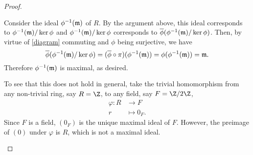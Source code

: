 \documentclass[10pt]{amsart}
\begin{document}
\begin{thm}
\begin{proof}
\begin{enumerate}[(a)]
      Consider the ideal $\phi^{-1}(\mathfrak{m})$ of $R$.  
      By the argument above, this ideal corresponds to $\phi^{-1}(\mathfrak{m}) / \ker \phi$ and $\phi^{-1}(\mathfrak{m}) / \ker \phi$ corresponds to $\overline{\phi}(\phi^{-1}(\mathfrak{m})/\ker \phi)$.
      Then, by virtue of \eqref{diagram} commuting and $\phi$ being surjective, we have 
      $$\overline{\phi}(\phi^{-1}(\mathfrak{m})/\ker \phi) = (\overline{\phi} \circ \pi)(\phi^{-1}(\mathfrak{m})) = \phi(\phi^{-1}(\mathfrak{m})) = \mathfrak{m}.$$
      Therefore $\phi^{-1}(\mathfrak{m})$ is maximal, as desired.

      To see that this does not hold in general, take the trivial homomorphism from any non-trivial ring, say $R = \Z$, to any field, say $F = \Z/2\Z$,
      \begin{align*}
        \varphi \colon R &\rightarrow F\\
        r &\mapsto 0_F.
      \end{align*}
      Since $F$ is a field, $(0_F)$ is the unique maximal ideal of $F$.  However, the preimage of $(0)$ under $\varphi$ is $R$, which is not a maximal ideal.
    \end{enumerate}
  \end{proof}
\end{thm}
\end{document}
